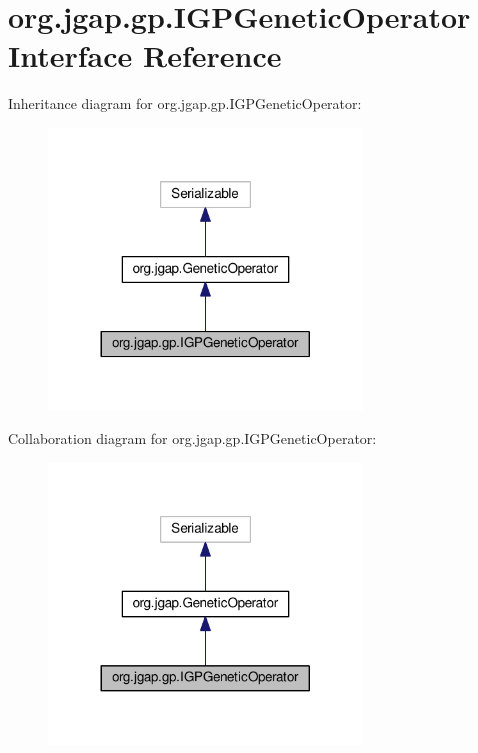 \hypertarget{interfaceorg_1_1jgap_1_1gp_1_1_i_g_p_genetic_operator}{\section{org.\-jgap.\-gp.\-I\-G\-P\-Genetic\-Operator Interface Reference}
\label{interfaceorg_1_1jgap_1_1gp_1_1_i_g_p_genetic_operator}
}


Inheritance diagram for org.\-jgap.\-gp.\-I\-G\-P\-Genetic\-Operator\-:
\nopagebreak
\begin{figure}[H]
\begin{center}
\leavevmode
\includegraphics[width=236pt]{interfaceorg_1_1jgap_1_1gp_1_1_i_g_p_genetic_operator__inherit__graph}
\end{center}
\end{figure}


Collaboration diagram for org.\-jgap.\-gp.\-I\-G\-P\-Genetic\-Operator\-:
\nopagebreak
\begin{figure}[H]
\begin{center}
\leavevmode
\includegraphics[width=236pt]{interfaceorg_1_1jgap_1_1gp_1_1_i_g_p_genetic_operator__coll__graph}
\end{center}
\end{figure}
